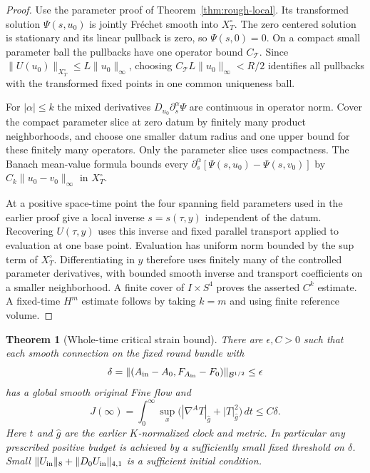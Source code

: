 \documentclass[11pt]{article}
\numberwithin{equation}{section}
\newtheorem{theorem}{Theorem}[section]
\theoremstyle{definition}
\theoremstyle{remark}
\begin{document}
\begin{proof}
Use the parameter proof of Theorem~\ref{thm:rough-local}.
Its transformed solution $\Psi(s,u_0)$ is jointly
Fr\'echet smooth into $X_T^\circ$. The zero centered
solution is stationary and its linear pullback is
zero, so $\Psi(s,0)=0$.
On a compact small parameter ball the pullbacks have
one operator bound $C_{\mathcal T}$. Since
$\|U(u_0)\|_{X_T^\circ}\le L\|u_0\|_\infty$,
choosing $C_{\mathcal T}L\|u_0\|_\infty<R/2$
identifies all pullbacks with the transformed
fixed points in one common uniqueness ball.

For $|\alpha|\le k$ the mixed derivatives
$D_{u_0}\partial_s^\alpha\Psi$ are continuous in
operator norm. Cover the compact parameter slice
at zero datum by finitely many product neighborhoods,
and choose one smaller datum radius and one upper
bound for these finitely many operators.
Only the parameter slice uses compactness.
The Banach mean-value formula bounds every
$\partial_s^\alpha[\Psi(s,u_0)-\Psi(s,v_0)]$
by $C_k\|u_0-v_0\|_\infty$ in $X_T^\circ$.

At a positive space-time point the four spanning
field parameters used in the earlier proof give a
local inverse $s=s(\tau,y)$ independent of the datum.
Recovering $U(\tau,y)$ uses this inverse and fixed
parallel transport applied to evaluation at one base
point. Evaluation has uniform norm bounded by the
sup term of $X_T^\circ$. Differentiating in $y$
therefore uses finitely many of the controlled
parameter derivatives, with bounded smooth inverse
and transport coefficients on a smaller neighborhood.
A finite cover of $I\times S^4$ proves the asserted
$C^k$ estimate. A fixed-time $H^m$ estimate follows
by taking $k=m$ and using finite reference volume.
\end{proof}

\begin{theorem}[Whole-time critical strain bound]
\label{thm:critical-global-budget}
There are $\epsilon,C>0$ such that each smooth
connection on the fixed round bundle with
\[
 \delta=\|(A_{\rm in}-A_0,F_{A_{\rm in}}-F_0)\|
                         _{\mathcal B^{1/2}}\le\epsilon
\]
has a global smooth original Fine flow and
\begin{equation}\label{eq:critical-global-budget}
 J(\infty)=\int_0^\infty
       \sup_x\bigl(|\nabla^AT|_{\widehat g}
                         +|T|_{\widehat g}^2\bigr)\,dt
       \le C\delta .
\end{equation}
Here $t$ and $\widehat g$ are the earlier $K$-normalized
clock and metric. In particular any prescribed positive
budget is achieved by a sufficiently small fixed
threshold on $\delta$. Small
$\|U_{\rm in}\|_8+\|D_0U_{\rm in}\|_{4,1}$ is a
sufficient initial condition.
\end{theorem}
\end{document}
